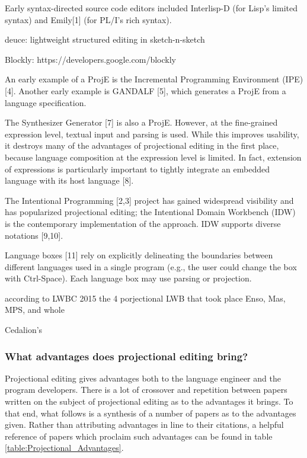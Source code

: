 Early syntax-directed source code editors included Interlisp-D (for Lisp’s limited syntax) and Emily[1] (for PL/I’s rich syntax).

deuce: lightweight structured editing in sketch-n-sketch

Blockly: https://developers.google.com/blockly



An early example of a ProjE is the Incremental Programming Environment (IPE) [4].
Another early example is GANDALF [5], which generates a ProjE from a language specification.

The Synthesizer Generator [7] is also a ProjE.
However, at the fine-grained expression level, textual input and parsing is used.
While this improves usability, it destroys many of the advantages of projectional editing in the first place, because language composition at the expression level is limited.
In fact, extension of expressions is particularly important to tightly integrate an embedded language with its host language [8].

The Intentional Programming [2,3] project has gained widespread visibility and has popularized projectional editing; the Intentional Domain Workbench (IDW) is the contemporary implementation of the approach.
IDW supports diverse notations [9,10].


Language boxes [11] rely on explicitly delineating the boundaries between different languages used in a single program (e.g., the user could change the box with Ctrl-Space).
Each language box may use parsing or projection.


according to LWBC 2015 the 4 porjectional LWB that took place Enso, Mas, MPS, and whole


Cedalion's 







\subsubsection{What advantages does projectional editing bring?}

Projectional editing gives advantages both to the language engineer and the program developers.
There is a lot of crossover and repetition between papers written on the subject of projectional editing as to the advantages it brings.
To that end, what follows is a synthesis of a number of papers as to the advantages given.
Rather than attributing advantages in line to their citations, a helpful reference of papers which proclaim such advantages can be found in table \ref{table:Projectional_Advantages}.

